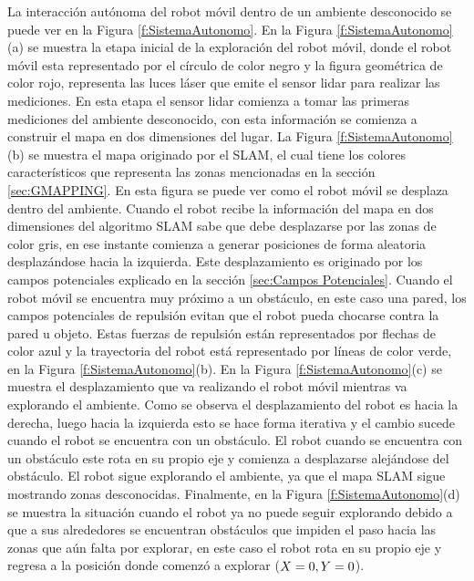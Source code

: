 La interacción autónoma del robot móvil dentro de un ambiente desconocido se puede ver en la 
Figura \ref{f:SistemaAutonomo}. En la Figura \ref{f:SistemaAutonomo}(a) se muestra la 
etapa inicial de la exploración del robot móvil, donde el robot móvil esta representado por 
el círculo de color negro y la figura geométrica de color rojo, representa las luces láser 
que emite el sensor lidar para realizar las mediciones. En esta etapa el sensor lidar comienza a 
tomar las primeras mediciones del ambiente desconocido, con esta información se comienza a 
construir el mapa en dos dimensiones del lugar. La Figura \ref{f:SistemaAutonomo}(b) se muestra 
el mapa originado por el SLAM, el cual tiene los colores característicos que representa
las zonas mencionadas en la sección \ref{sec:GMAPPING}. En esta figura se puede ver como el robot
móvil se desplaza dentro del ambiente. Cuando el robot recibe la información del mapa en dos 
dimensiones del algoritmo SLAM sabe que debe desplazarse por las zonas de color gris, en ese 
instante comienza a generar posiciones de forma aleatoria desplazándose hacia la izquierda. Este 
desplazamiento es originado por los campos potenciales explicado en la sección 
\ref{sec:Campos Potenciales}. Cuando el robot móvil se encuentra muy próximo a un obstáculo, en 
este caso una pared, los campos potenciales de repulsión evitan que el robot pueda chocarse contra
la pared u objeto. Estas fuerzas de repulsión están representados por flechas de color azul y la 
trayectoria del robot está representado por líneas de color verde, en la Figura 
\ref{f:SistemaAutonomo}(b). En la Figura \ref{f:SistemaAutonomo}(c) se muestra el desplazamiento 
que va realizando el robot móvil mientras va explorando el ambiente. Como se observa el 
desplazamiento del robot es hacia la derecha, luego hacia la izquierda esto se hace forma iterativa
y el cambio sucede cuando el robot se encuentra con un obstáculo. El robot cuando se encuentra 
con un obstáculo este rota en su propio eje y comienza a desplazarse alejándose del obstáculo. El robot 
sigue explorando el ambiente, ya que el mapa SLAM sigue mostrando zonas desconocidas. Finalmente, 
en la Figura \ref{f:SistemaAutonomo}(d) se muestra la situación cuando el robot ya no puede seguir 
explorando debido a que a sus alrededores se encuentran obstáculos que impiden el paso hacia las zonas
que aún falta por explorar, en este caso el robot rota en su propio eje y regresa a la posición 
donde comenzó a explorar ($\mathnormal X=0,\mathnormal Y=0$).

